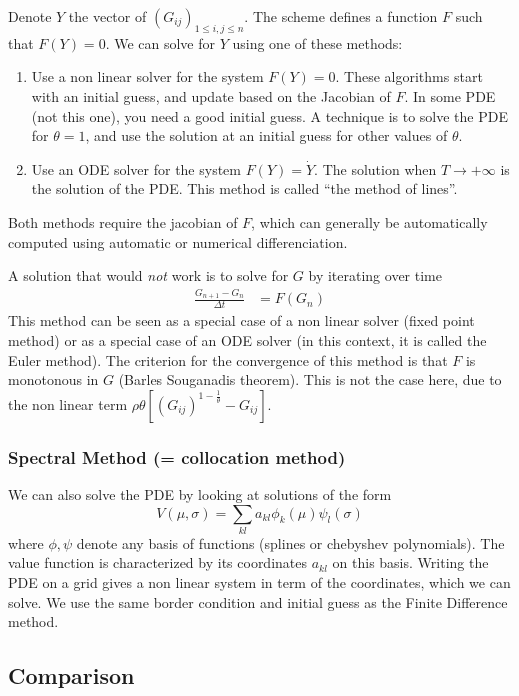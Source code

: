 \documentclass[english]{article}
\begin{document}
Denote $Y$ the vector of  $(G_{ij})_{1 \leq i,j\leq n}$. The scheme  defines a function $F$ such that $F(Y) = 0$. We can solve for $Y$ using one of these methods:
\begin{enumerate}
	\item Use a non linear solver for the system $F(Y) = 0$. These algorithms start with an initial guess, and update based on the Jacobian of $F$. In some PDE (not this one), you need a good initial guess. A technique is to solve the PDE for $\theta = 1$, and use the solution at an initial guess for other values of $\theta$.
	\item Use an ODE solver for the system $F(Y) = \dot{Y}$. The solution when $T\rightarrow +\infty$ is the solution of the PDE. This method is called ``the method of lines''.
\end{enumerate}
Both methods require the jacobian of $F$, which can generally be automatically computed using automatic or numerical differenciation. 

A solution that would \textit{not} work is to solve for $G$ by iterating over time
\begin{align*}
	\frac{G_{n+1}-G_n}{\Delta t} &= F(G_n)
\end{align*}
This method can be seen as a special case of a non linear solver (fixed point method) or as a special case of an ODE solver (in this context, it is called the Euler method). The criterion for the convergence of this method is that $F$ is monotonous in $G$ (Barles Souganadis theorem). This is not the case here, due to the non linear term  $\rho \theta[(G_{ij})^{1-\frac{1}{\theta}}- G_{ij}]$.

\subsubsection{Spectral Method (= collocation method)}
We can also solve the PDE by looking at solutions of the form
$$V(\mu, \sigma) = \sum_{kl} a_{kl} \phi_k(\mu)\psi_l(\sigma)$$
where $\phi, \psi$ denote any basis of functions (splines or chebyshev polynomials).
The value function is characterized by its coordinates $a_{kl}$ on this basis. Writing the PDE on a grid gives a non linear system in term of the coordinates, which we can solve. We use the same border condition and initial guess as the Finite Difference method.

\subsection{Comparison}
\end{document}
